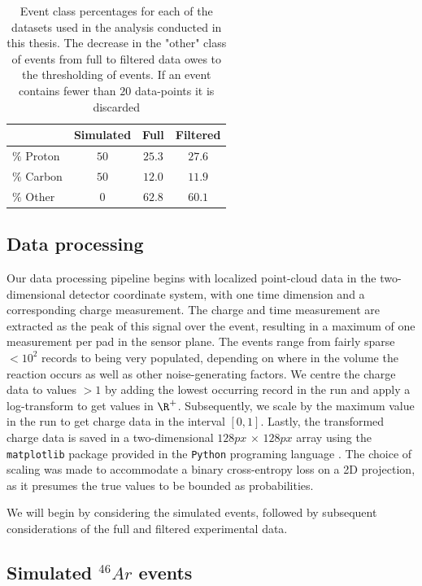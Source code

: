 \begin{table}
\centering
\caption{Event class percentages for each of the datasets used in the analysis conducted in this thesis. The decrease in the "other" class of events from full to filtered data owes to the thresholding of events. If an event contains fewer than $20$ data-points it is discarded}\label{tab:class_distr}
\begin{tabular}{lccc}
\toprule
{} & Simulated & Full & Filtered \\
\midrule
$\%$ Proton & $50$ & $25.3$ & $27.6$ \\ 
$\%$ Carbon & $50$ & $12.0$ & $11.9$ \\
$\%$ Other & $0$ & $62.8$ & $60.1$ \\
\end{tabular}
\end{table}


\subsection{Data processing}

Our data processing pipeline begins with localized point-cloud data in the two-dimensional detector coordinate system, with one time dimension and a corresponding charge measurement. The charge and time measurement are extracted as the peak of this signal over the event, resulting in a maximum of one measurement per pad in the sensor plane. The events range from fairly sparse $< 10^2$ records to being very populated, depending on where in the volume the reaction occurs as well as other noise-generating factors. We centre the charge data to values $>1$ by adding the lowest occurring record in the run and apply a log-transform to get values in $\R^+$. Subsequently, we scale by the maximum value in the run to get charge data in the interval $[0, 1]$. Lastly, the transformed charge data is saved in a two-dimensional $128px\, \times \,128px$ array using the \lstinline{matplotlib} package provided in the \lstinline{Python} programing language \cite{matplotlib}. The choice of scaling was made to accommodate a binary cross-entropy loss on a 2D projection, as it presumes the true values to be bounded as probabilities.

We will begin by considering the simulated events, followed by subsequent considerations of the full and filtered experimental data.

\subsection{Simulated \texorpdfstring{${}^{46}Ar$}{46Ar}  events}\label{sec:data_sim}


